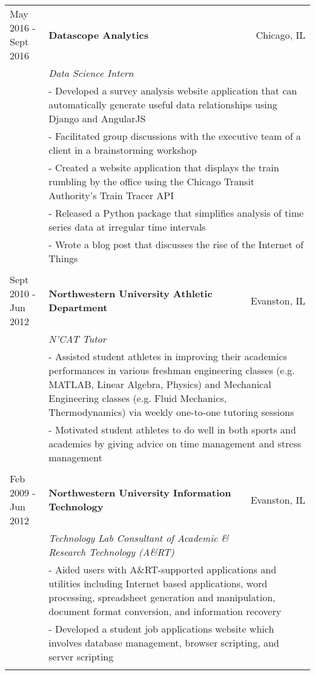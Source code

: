 \documentclass[letterpaper]{article}
\begin{document}
\begin{tabular*}{\textwidth}{@{\extracolsep{\fill}} l l r}
May 2016 - Sept 2016 &\textbf{Datascope Analytics} & Chicago, IL\\
 & \textit{Data Science Intern} & \\
 & \multicolumn{2}{p{0.8\textwidth}}{- Developed a survey analysis website application that can automatically generate useful data relationships using Django and AngularJS} \\ 
 & \multicolumn{2}{p{0.8\textwidth}}{- Facilitated group discussions with the executive team of a client in a brainstorming workshop} \\ 
 & \multicolumn{2}{p{0.8\textwidth}}{- Created a website application that displays the train rumbling by the office using the Chicago Transit Authority's Train Tracer API} \\ 
 & \multicolumn{2}{p{0.8\textwidth}}{- Released a Python package that simplifies analysis of time series data at irregular time intervals} \\ 
  & \multicolumn{2}{p{0.8\textwidth}}{- Wrote a blog post that discusses the rise of the Internet of Things} \\ \\	
	
Sept 2010 - Jun 2012 &\textbf{Northwestern University Athletic Department} & Evanston, IL\\
 & \textit{N'CAT Tutor} & \\
 & \multicolumn{2}{p{0.8\textwidth}}{- Assisted student athletes in improving their academics performances in various freshman engineering classes (e.g. MATLAB, Linear Algebra, Physics) and Mechanical Engineering classes (e.g. Fluid Mechanics, Thermodynamics) via weekly one-to-one tutoring sessions} \\ 
& \multicolumn{2}{p{0.8\textwidth}}{- Motivated student athletes to do well in both sports and academics by giving advice on time management and stress management}  \\ \\

Feb 2009 - Jun 2012 &\textbf{Northwestern University Information Technology} & Evanston, IL\\
 & \textit{Technology Lab Consultant of Academic \& Research Technology (A\&RT)} & \\
 & \multicolumn{2}{p{0.8\textwidth}}{- Aided users with A\&RT-supported applications and utilities including Internet based applications, word processing, spreadsheet generation and manipulation, document format conversion, and information recovery} \\ 
& \multicolumn{2}{p{0.8\textwidth}}{- Developed a student job applications website which involves database management, browser scripting, and server scripting} \\ \\


\end{tabular*}
\end{document}
